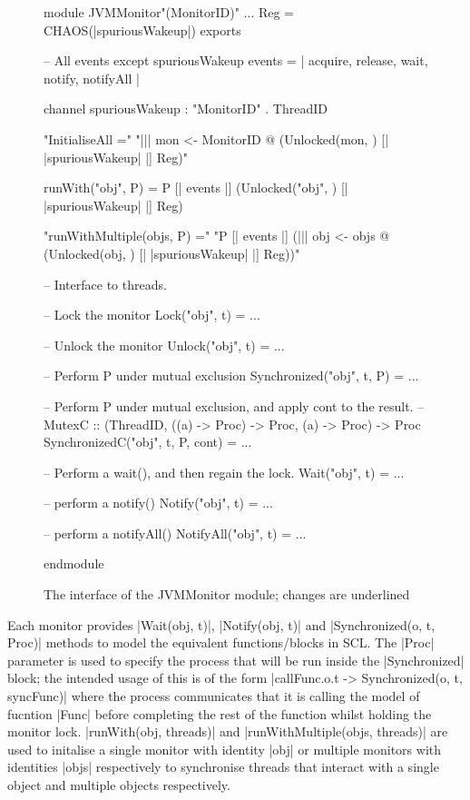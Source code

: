 \begin{figure}[H]
\begin{cspm}
module JVMMonitor"(MonitorID)"
    ...
    Reg = CHAOS({|spuriousWakeup|})
exports

    -- All events except spuriousWakeup
    events = {| acquire, release, wait, notify, notifyAll |}

    channel spuriousWakeup : "MonitorID" . ThreadID
  
    "InitialiseAll ="
      "||| mon <- MonitorID @ (Unlocked(mon, {})  [| {|spuriousWakeup|} |] Reg)"

    runWith("obj", P) = P [| events |] (Unlocked("obj", {})  [| {|spuriousWakeup|} |] Reg)

    "runWithMultiple(objs, P) ="
    "P [| events |] (||| obj <- objs @ (Unlocked(obj, {})  [| {|spuriousWakeup|} |] Reg))"

    -- Interface to threads.

    -- Lock the monitor
    Lock("obj", t) = ...

    -- Unlock the monitor
    Unlock("obj", t) = ...

    -- Perform P under mutual exclusion
    Synchronized("obj", t, P) = ...

    -- Perform P under mutual exclusion, and apply cont to the result. 
    -- MutexC :: (ThreadID, ((a) -> Proc) -> Proc, (a) -> Proc) -> Proc
    SynchronizedC("obj", t, P, cont) = ...

    -- Perform a wait(), and then regain the lock.
    Wait("obj", t) = ... 

    -- perform a notify()
    Notify("obj", t) = ...

    -- perform a notifyAll()
    NotifyAll("obj", t) = ...

endmodule
\end{cspm}
\caption{The interface of the JVMMonitor module; changes are underlined}
\label{listing::JVMMonitorInterface}
\end{figure}

Each monitor provides |Wait(obj, t)|, |Notify(obj, t)| and |Synchronized(o, t, Proc)| methods to model the equivalent functions/blocks in SCL. The |Proc| parameter is used to specify the process that will be run inside the |Synchronized| block; the intended usage of this is of the form |callFunc.o.t -> Synchronized(o, t, syncFunc)| where the process communicates that it is calling the model of fucntion |Func| before completing the rest of the function whilst holding the monitor lock. |runWith(obj, threads)| and |runWithMultiple(objs, threads)| are used to initalise a single monitor with identity |obj| or multiple monitors with identities |objs| respectively to synchronise threads that interact with a single object and multiple objects respectively.


% 

